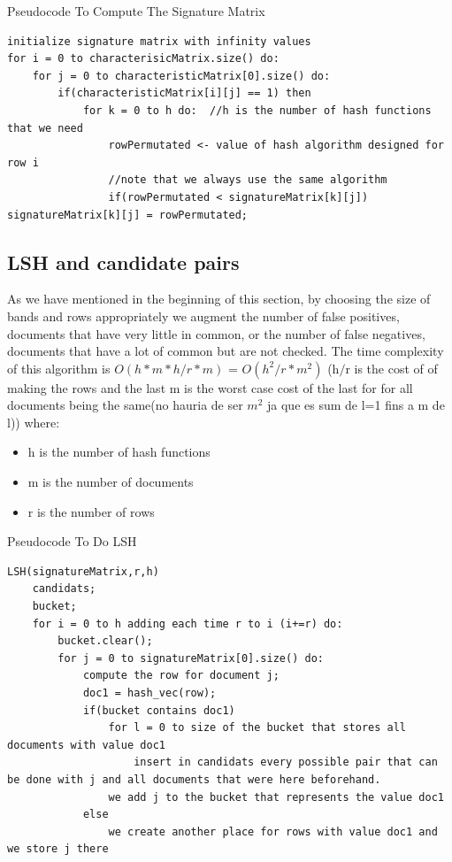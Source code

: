 \documentclass[12pt]{article}
\begin{document}
{ \begin{center}
\begin{large}
Pseudocode To Compute The Signature Matrix
\end{large}
\end{center}
\begin{lstlisting}
initialize signature matrix with infinity values
for i = 0 to characterisicMatrix.size() do:
	for j = 0 to characteristicMatrix[0].size() do:
		if(characteristicMatrix[i][j] == 1) then
			for k = 0 to h do:	//h is the number of hash functions that we need
				rowPermutated <- value of hash algorithm designed for row i
				//note that we always use the same algorithm
				if(rowPermutated < signatureMatrix[k][j]) signatureMatrix[k][j] = rowPermutated;
\end{lstlisting}
\medskip


\subsection{LSH and candidate pairs}
As we have mentioned in the beginning of this section, by choosing the size of bands and rows appropriately we augment the number of false positives, documents that have very little in common, or the number of false negatives, documents that have a lot of common but are not checked. The time complexity of this algorithm is $O(h * m * h/r * m )$ = $O(h^2 /r * m^2)$ (h$/$r is the cost of of making the rows and the last m is the worst case cost of the last for for all documents being the same(no hauria de ser $m^2$ ja que es sum de l=1 fins a m de l)) where: 
\begin{itemize}
\item h is the number of hash functions
\item m is the number of documents
\item r is the number of rows
\end{itemize}
 \begin{center}
\begin{large}
Pseudocode To Do LSH
\end{large}
\end{center}

\begin{lstlisting}
LSH(signatureMatrix,r,h)
    candidats;                     
    bucket;
    for i = 0 to h adding each time r to i (i+=r) do:
        bucket.clear();
        for j = 0 to signatureMatrix[0].size() do:
            compute the row for document j;
            doc1 = hash_vec(row);
            if(bucket contains doc1)
                for l = 0 to size of the bucket that stores all documents with value doc1 
                    insert in candidats every possible pair that can be done with j and all documents that were here beforehand.
                we add j to the bucket that represents the value doc1
            else
                we create another place for rows with value doc1 and we store j there


\end{lstlisting}}
\end{document}

